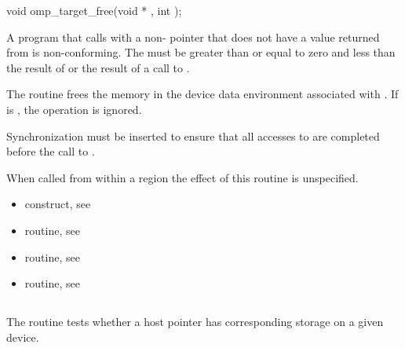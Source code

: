 \format
\begin{boxedcode}
void omp\_target\_free(void * , int );
\end{boxedcode}

\constraints

A program that calls  with a non- pointer 
that does not have a value returned from  is
non-conforming.  The  must be greater than or equal to 
zero and less than the result of  or the
 result of a call to .

\effect

The  routine frees the memory in the device data
environment associated with .  If  is
, the operation is ignored.

Synchronization must be inserted to ensure that all accesses to 
 are completed before the call to .

When called from within a  region the effect of this routine
is unspecified.

\crossreferences
\begin{itemize}
\item {} construct, see 

\item {} routine, see 

\item {} routine, see 

\item {} routine, see 
\end{itemize}



\pagebreak
{}
\subsection{}
\label{subsec:omp_target_is_present}
\summary

The  routine tests whether a host pointer
has corresponding storage on a given device.

